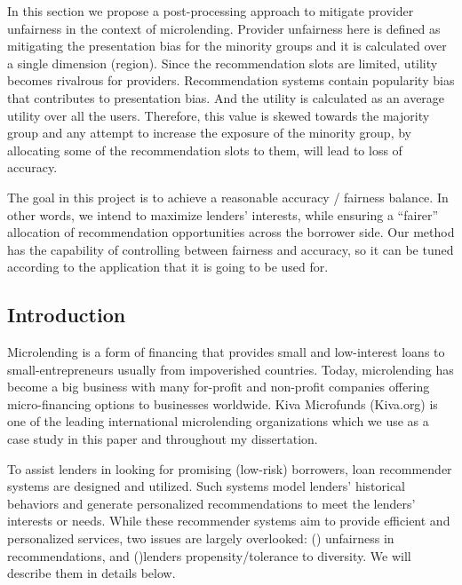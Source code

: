 \label{sec:farpfar}

In this section we propose a post-processing approach to mitigate provider unfairness in the context of microlending. Provider unfairness here is defined as mitigating the presentation bias for the minority groups and it is calculated over a single dimension (region). Since the recommendation slots are limited, utility becomes rivalrous for providers. Recommendation systems contain popularity bias that contributes to presentation bias. And the utility is calculated as an average utility over all the users. Therefore, this value is skewed towards the majority group and any attempt to increase the exposure of the minority group, by allocating some of the recommendation slots to them, will lead to loss of accuracy. 

The goal in this project is to achieve a reasonable accuracy / fairness balance. In other words, we intend to maximize lenders' interests, while ensuring a ``fairer'' allocation of recommendation opportunities across the borrower side. Our method has the capability of controlling between fairness and accuracy, so it can be tuned according to the application that it is going to be used for.

\subsection{Introduction}

Microlending is a form of financing that provides small and low-interest loans to small-entrepreneurs usually from impoverished countries. Today, microlending has become a big business with many for-profit and non-profit companies offering micro-financing options to businesses worldwide. Kiva Microfunds (Kiva.org) is one of the leading international microlending organizations which we use as a case study in this paper and throughout my dissertation.

To assist lenders in looking for promising (low-risk) borrowers, loan recommender systems \cite{choo2014gather,choo2014understanding} are designed and utilized. Such systems model lenders' historical behaviors and generate personalized recommendations to meet the lenders' interests or needs. While these recommender systems aim to provide efficient and personalized services, two issues are largely overlooked: () unfairness in recommendations, and ()lenders propensity/tolerance to diversity. We will describe them in details below. 

